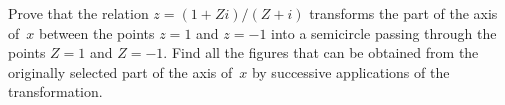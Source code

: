 Prove that the relation $z = (1 + Zi)/(Z + i)$ transforms the part of the
axis of~$x$ between the points $z = 1$ and $z = -1$ into a semicircle passing
through the points $Z = 1$ and $Z = -1$. Find all the figures that can be obtained
from the originally selected part of the axis of~$x$ by successive applications of
the transformation. 

